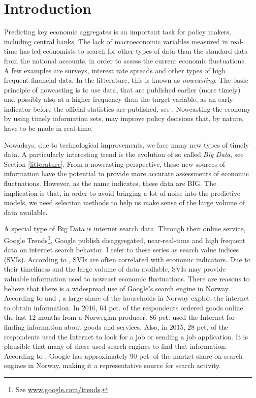 \section{Introduction}\label{introduction}

Predicting key economic aggregates is an important task for policy makers, including central banks. The lack of macroeconomic variables measured in real-time has led economists to search for other types of data than the standard data from the national accounts, in order to assess the current economic fluctuations. A few examples are surveys, interest rate spreads and other types of high frequent financial data. In the litterature, this is known as \textit{nowcasting}. The basic principle of nowcasting is to use data, that are published earlier (more timely) and possibly also at a higher frequency than the target variable, as an early indicator before the official statistics are published, see \textcite{banbura2013}. Nowcasting the economy by using timely information sets, may improve policy decisions that, by nature, have to be made in real-time.
 
Nowadays, due to technological improvements, we face many new types of timely data. A particularly interesting trend is the evolution of so called \textit{Big Data}, see Section \ref{litterature}. From a nowcasting perspective, these new sources of information have the potential to provide more accurate assessments of economic fluctuations. However, as the name indicates, these data are BIG. The implication is that, in order to avoid bringing a lot of noise into the predictive models, we need selection methods to help us make sense of the large volume of data available.

A special type of Big Data is internet search data. Through their online service, Google Trends\footnote{See \url{www.google.com/trends}.}, Google publish disaggregated, near-real-time and high frequent data on internet search behavior. I refer to these series as search value indices (SVIs). According to \textcite{choi2012}, SVIs are often correlated with economic indicators. Due to their timeliness and the large volume of data available, SVIs may provide valuable information used to nowcast economic fluctuations. There are reasons to believe that there is a widespread use of Google's search engine in Norway. According to \textcite{ssb2015} and \textcite{ssb2016}, a large share of the households in Norway exploit the internet to obtain information. In 2016, 64 pct. of the respondents ordered goods online the last 12 months from a Norwegian producer. 86 pct. used the Internet for finding information about goods and services. Also, in 2015, 28 pct. of the respondents used the Internet to look for a job or sending a job application. It is plausible that many of these used search engines to find that information. According to \textcite{statcounter2016}, Google has approximately 90 pct. of the market share on search engines in Norway, making it a representative source for search activity.

